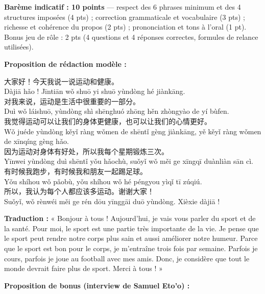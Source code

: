 \documentclass[11pt]{article}
\begin{document}
\begin{corrige}
\textbf{Barème indicatif : 10 points} — respect des 6 phrases minimum et des 4 structures imposées (4 pts) ; correction grammaticale et vocabulaire (3 pts) ; richesse et cohérence du propos (2 pts) ; prononciation et tons à l'oral (1 pt). Bonus jeu de rôle : 2 pts (4 questions et 4 réponses correctes, formules de relance utilisées).

\textbf{Proposition de rédaction modèle :}

\begin{textebox}
大家好！今天我说一说运动和健康。\\
Dàjiā hǎo ! Jīntiān wǒ shuō yi shuō yùndòng hé jiànkāng.\\
对我来说，运动是生活中很重要的一部分。\\
Duì wǒ láishuō, yùndòng shì shēnghuó zhōng hěn zhòngyào de yí bùfen.\\
我觉得运动可以让我们的身体更健康，也可以让我们的心情更好。\\
Wǒ juéde yùndòng kěyǐ ràng wǒmen de shēntǐ gèng jiànkāng, yě kěyǐ ràng wǒmen de xīnqíng gèng hǎo.\\
因为运动对身体有好处，所以我每个星期锻炼三次。\\
Yīnwei yùndòng duì shēntǐ yǒu hǎochù, suǒyǐ wǒ měi ge xīngqī duànliàn sān cì.\\
有时候我跑步，有时候我和朋友一起踢足球。\\
Yǒu shíhou wǒ pǎobù, yǒu shíhou wǒ hé péngyou yìqǐ tī zúqiú.\\
所以，我认为每个人都应该多运动。谢谢大家！\\
Suǒyǐ, wǒ rènwéi měi ge rén dōu yīnggāi duō yùndòng. Xièxie dàjiā !
\end{textebox}

\textbf{Traduction :} « Bonjour à tous ! Aujourd'hui, je vais vous parler du sport et de la santé. Pour moi, le sport est une partie très importante de la vie. Je pense que le sport peut rendre notre corps plus sain et aussi améliorer notre humeur. Parce que le sport est bon pour le corps, je m'entraîne trois fois par semaine. Parfois je cours, parfois je joue au football avec mes amis. Donc, je considère que tout le monde devrait faire plus de sport. Merci à tous ! »

\textbf{Proposition de bonus (interview de Samuel Eto'o) :}


\end{corrige}
\end{document}
